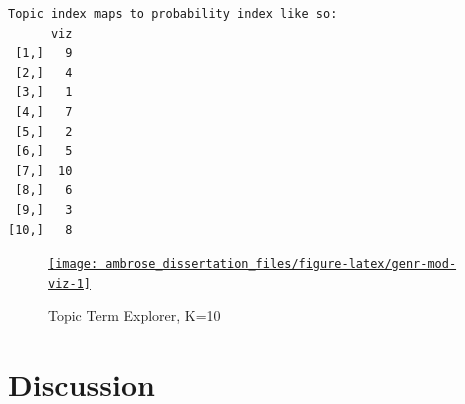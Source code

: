\documentclass[]{book}
\theoremstyle{definition}
\theoremstyle{definition}
\theoremstyle{definition}
\theoremstyle{remark}
\begin{document}
\begin{verbatim}
Topic index maps to probability index like so:
      viz
 [1,]   9
 [2,]   4
 [3,]   1
 [4,]   7
 [5,]   2
 [6,]   5
 [7,]  10
 [8,]   6
 [9,]   3
[10,]   8
\end{verbatim}

\begin{figure}

{\centering \href{https://mercury.dlab.berkeley.edu:2018}{\texttt{[image: ambrose\_dissertation\_files/figure-latex/genr-mod-viz-1]} }

}

\caption{Topic Term Explorer, K=10}\label{fig:genr-mod-viz}
\end{figure}

\hypertarget{discussion}{%
\section{Discussion}\label{discussion}}


\end{document}
